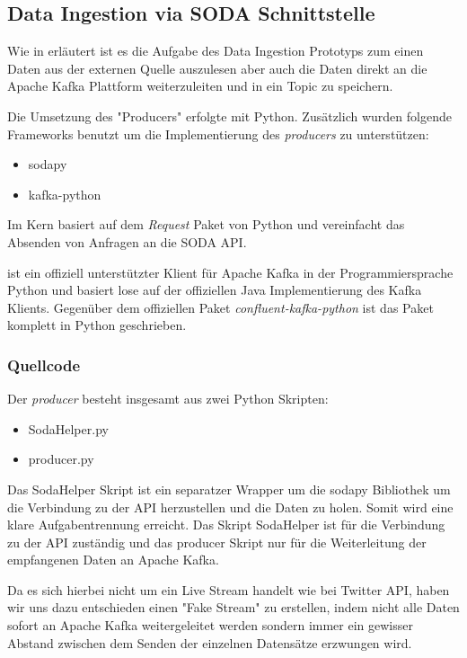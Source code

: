 \subsection{Data Ingestion via \acs{SODA} Schnittstelle}
Wie in  erläutert ist es die Aufgabe des Data Ingestion Prototyps zum einen Daten aus der externen Quelle auszulesen
aber auch die Daten direkt an die Apache Kafka Plattform weiterzuleiten und in ein Topic zu speichern.

Die Umsetzung des "Producers" erfolgte mit Python.
Zusätzlich wurden folgende Frameworks benutzt um die Implementierung des \textit{producers} zu unterstützen:

\begin{itemize}
  \item sodapy
  \item kafka-python
\end{itemize}

Im Kern basiert  auf dem \textit{Request} Paket von Python und vereinfacht das Absenden von Anfragen an die \ac{SODA} \ac{API}.\autocite{Sodapy}

 ist ein offiziell unterstützter Klient für Apache Kafka in der Programmiersprache Python und basiert lose auf der offiziellen Java Implementierung des Kafka Klients.\autocite{KafkaPython}
Gegenüber dem offiziellen Paket \textit{confluent-kafka-python} ist das Paket  komplett in Python geschrieben.\autocite{KafkaClients}

\subsubsection{Quellcode}
Der \textit{producer} besteht insgesamt aus zwei Python Skripten:

\begin{itemize}
  \item SodaHelper.py
  \item producer.py
\end{itemize}

Das SodaHelper Skript ist ein separatzer Wrapper um die sodapy Bibliothek um die Verbindung zu der \ac{API} herzustellen und die Daten zu holen.
Somit wird eine klare Aufgabentrennung erreicht.
Das Skript SodaHelper ist für die Verbindung zu der \ac{API} zuständig und das producer Skript nur für die Weiterleitung der empfangenen Daten an Apache Kafka.

Da es sich hierbei nicht um ein Live Stream handelt wie \zb{} bei Twitter \ac{API}, haben wir uns dazu entschieden einen "Fake Stream" zu erstellen,
indem nicht alle Daten sofort an Apache Kafka weitergeleitet werden sondern immer ein gewisser Abstand zwischen dem Senden der einzelnen Datensätze
erzwungen wird.

